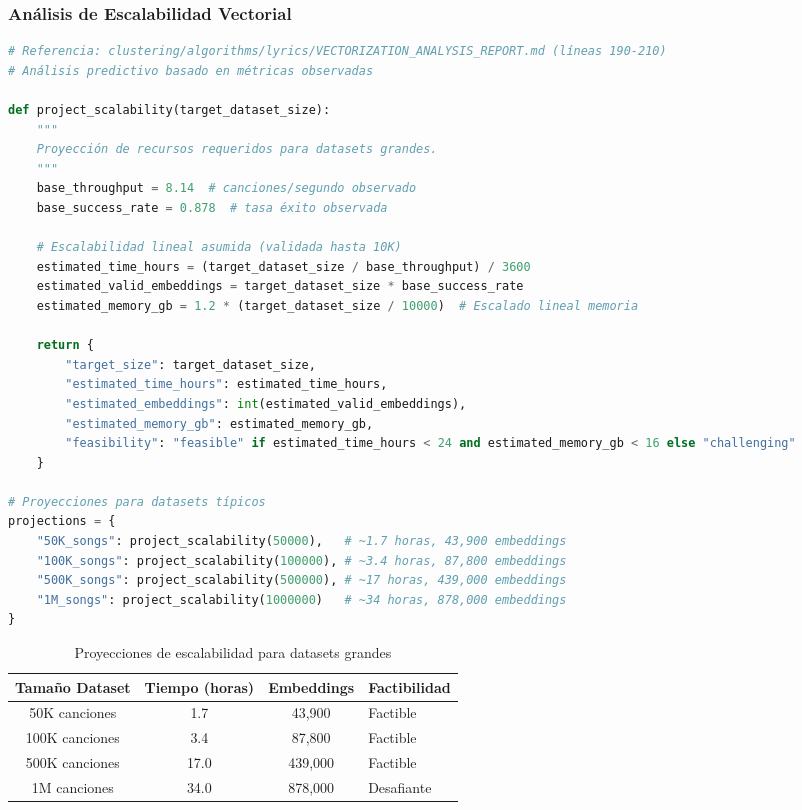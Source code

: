 \documentclass[12pt,a4paper]{report}
\begin{document}
\subsubsection{Análisis de Escalabilidad Vectorial}

\begin{lstlisting}[language=Python, caption={Proyección de escalabilidad para datasets grandes}]
# Referencia: clustering/algorithms/lyrics/VECTORIZATION_ANALYSIS_REPORT.md (líneas 190-210)
# Análisis predictivo basado en métricas observadas

def project_scalability(target_dataset_size):
    """
    Proyección de recursos requeridos para datasets grandes.
    """
    base_throughput = 8.14  # canciones/segundo observado
    base_success_rate = 0.878  # tasa éxito observada

    # Escalabilidad lineal asumida (validada hasta 10K)
    estimated_time_hours = (target_dataset_size / base_throughput) / 3600
    estimated_valid_embeddings = target_dataset_size * base_success_rate
    estimated_memory_gb = 1.2 * (target_dataset_size / 10000)  # Escalado lineal memoria

    return {
        "target_size": target_dataset_size,
        "estimated_time_hours": estimated_time_hours,
        "estimated_embeddings": int(estimated_valid_embeddings),
        "estimated_memory_gb": estimated_memory_gb,
        "feasibility": "feasible" if estimated_time_hours < 24 and estimated_memory_gb < 16 else "challenging"
    }

# Proyecciones para datasets típicos
projections = {
    "50K_songs": project_scalability(50000),   # ~1.7 horas, 43,900 embeddings
    "100K_songs": project_scalability(100000), # ~3.4 horas, 87,800 embeddings
    "500K_songs": project_scalability(500000), # ~17 horas, 439,000 embeddings
    "1M_songs": project_scalability(1000000)   # ~34 horas, 878,000 embeddings
}
\end{lstlisting}

\begin{table}[h]
\centering
\caption{Proyecciones de escalabilidad para datasets grandes}
\begin{tabular}{@{}cccl@{}}
\toprule
\textbf{Tamaño Dataset} & \textbf{Tiempo (horas)} & \textbf{Embeddings} & \textbf{Factibilidad} \\
\midrule
50K canciones & 1.7 & 43,900 & Factible \\
100K canciones & 3.4 & 87,800 & Factible \\
500K canciones & 17.0 & 439,000 & Factible \\
1M canciones & 34.0 & 878,000 & Desafiante \\
\bottomrule
\end{tabular}
\end{table}
\end{document}
